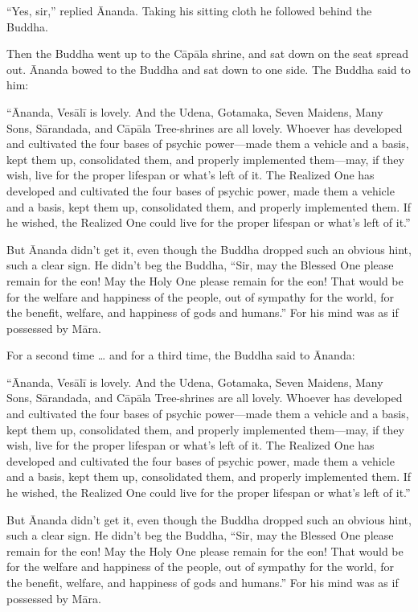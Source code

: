 \documentclass[12pt,openany]{book}%
\begin{document}
“Yes, sir,” replied Ānanda. Taking his sitting cloth he followed behind the Buddha. 

Then the Buddha went up to the \textsanskrit{Cāpāla} shrine, and sat down on the seat spread out. Ānanda bowed to the Buddha and sat down to one side. The Buddha said to him: 

“Ānanda, \textsanskrit{Vesālī} is lovely. And the Udena, Gotamaka, Seven Maidens, Many Sons, \textsanskrit{Sārandada}, and \textsanskrit{Cāpāla} Tree-shrines are all lovely. Whoever has developed and cultivated the four bases of psychic power—made them a vehicle and a basis, kept them up, consolidated them, and properly implemented them—may, if they wish, live for the proper lifespan or what’s left of it. The Realized One has developed and cultivated the four bases of psychic power, made them a vehicle and a basis, kept them up, consolidated them, and properly implemented them. If he wished, the Realized One could live for the proper lifespan or what’s left of it.” 

But Ānanda didn’t get it, even though the Buddha dropped such an obvious hint, such a clear sign. He didn’t beg the Buddha, “Sir, may the Blessed One please remain for the eon! May the Holy One please remain for the eon! That would be for the welfare and happiness of the people, out of sympathy for the world, for the benefit, welfare, and happiness of gods and humans.” For his mind was as if possessed by \textsanskrit{Māra}. 

For a second time … and for a third time, the Buddha said to Ānanda: 

“Ānanda, \textsanskrit{Vesālī} is lovely. And the Udena, Gotamaka, Seven Maidens, Many Sons, \textsanskrit{Sārandada}, and \textsanskrit{Cāpāla} Tree-shrines are all lovely. Whoever has developed and cultivated the four bases of psychic power—made them a vehicle and a basis, kept them up, consolidated them, and properly implemented them—may, if they wish, live for the proper lifespan or what’s left of it. The Realized One has developed and cultivated the four bases of psychic power, made them a vehicle and a basis, kept them up, consolidated them, and properly implemented them. If he wished, the Realized One could live for the proper lifespan or what’s left of it.” 

But Ānanda didn’t get it, even though the Buddha dropped such an obvious hint, such a clear sign. He didn’t beg the Buddha, “Sir, may the Blessed One please remain for the eon! May the Holy One please remain for the eon! That would be for the welfare and happiness of the people, out of sympathy for the world, for the benefit, welfare, and happiness of gods and humans.” For his mind was as if possessed by \textsanskrit{Māra}. 
\end{document}
